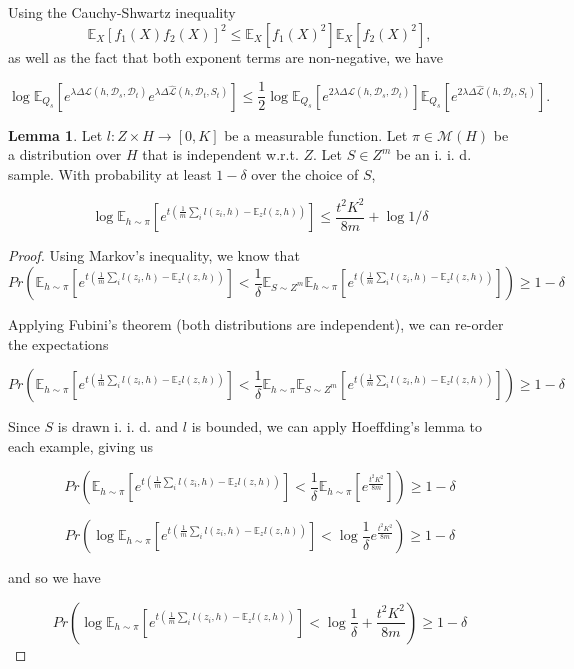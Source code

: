 \documentclass[letterpaper]{article}
\theoremstyle{definition}
\newtheorem{lemma}{Lemma}[section]
\begin{document}
Using the Cauchy-Shwartz inequality $$\mathbb{E}_{X}\left [f_1(X)f_2(X)\right ]^2\leq \mathbb{E}_{X}\left [f_1(X)^2\right ]\mathbb{E}_{X}\left [f_2(X)^2\right ],$$
as well as the fact that both exponent terms are non-negative, we have

$$\log\mathbb{E}_{Q_{s}}\left [e^{\lambda\Delta\mathcal{L}(h,\mathcal{D}_s, \mathcal{D}_t)}e^{\lambda\Delta\hat{\mathcal{L}}(h,\mathcal{D}_t, S_t)} \right ]\leq \frac{1}{2}\log\mathbb{E}_{Q_{s}}\left [e^{2\lambda\Delta\mathcal{L}(h,\mathcal{D}_s, \mathcal{D}_t)}\right ]\mathbb{E}_{Q_{s}}\left [e^{2\lambda\Delta\hat{\mathcal{L}}(h,\mathcal{D}_t, S_t)} \right ].$$

\begin{lemma}
	Let $l:Z\times H\rightarrow[0,K]$ be a measurable function. Let $\pi\in\mathcal{M}(H)$ be a distribution over $H$ that is independent w.r.t. $Z$. Let $S\in Z^m$ be an i.\! i.\! d.\! sample. With probability at least $1-\delta$ over the choice of $S$,
	
	$$\log \mathbb{E}_{h\sim \pi}\left [e^{t(\frac{1}{m}\sum_i l(z_i,h)-\mathbb{E}_{z}l(z,h))}\right ]\leq \frac{t^2K^2}{8m}+\log{1/ \delta}$$
\end{lemma}

\begin{proof} \label{lemma:hoeffding-concentration}
	Using Markov's inequality, we know that 
	$$Pr\left (\mathbb{E}_{h\sim \pi}\left [e^{t(\frac{1}{m}\sum_i l(z_i,h)-\mathbb{E}_{z}l(z,h))}\right ]<\frac{1}{\delta}\mathbb{E}_{S\sim Z^m}\mathbb{E}_{h\sim \pi}\left [e^{t(\frac{1}{m}\sum_i l(z_i,h)-\mathbb{E}_{z}l(z,h))}\right ] \right ) \geq 1-\delta$$
	
	Applying Fubini's theorem (both distributions are independent), we can re-order the expectations
	
	$$Pr\left (\mathbb{E}_{h\sim \pi}\left [e^{t(\frac{1}{m}\sum_i l(z_i,h)-\mathbb{E}_{z}l(z,h))}\right ]<\frac{1}{\delta}\mathbb{E}_{h\sim \pi}\mathbb{E}_{S\sim Z^m}\left [e^{t(\frac{1}{m}\sum_i l(z_i,h)-\mathbb{E}_{z}l(z,h))}\right ] \right ) \geq 1-\delta$$
	
	Since $S$ is drawn i.\! i.\! d.\! and $l$ is bounded, we can apply Hoeffding's lemma to each example, giving us
	
	$$Pr\left (\mathbb{E}_{h\sim \pi}\left [e^{t(\frac{1}{m}\sum_i l(z_i,h)-\mathbb{E}_{z}l(z,h))}\right ]<\frac{1}{\delta}\mathbb{E}_{h\sim \pi}\left [e^{\frac{t^2K^2}{8m}}\right ] \right ) \geq 1-\delta$$
	
	$$Pr\left (\log\mathbb{E}_{h\sim \pi}\left [e^{t(\frac{1}{m}\sum_i l(z_i,h)-\mathbb{E}_{z}l(z,h))}\right ]<\log\frac{1}{\delta}e^{\frac{t^2K^2}{8m}} \right ) \geq 1-\delta$$
	
	and so we have 
	
	$$Pr\left (\log\mathbb{E}_{h\sim \pi}\left [e^{t(\frac{1}{m}\sum_i l(z_i,h)-\mathbb{E}_{z}l(z,h))}\right ]<\log\frac{1}{\delta}+\frac{t^2K^2}{8m} \right ) \geq 1-\delta$$
	
\end{proof}
\end{document}

